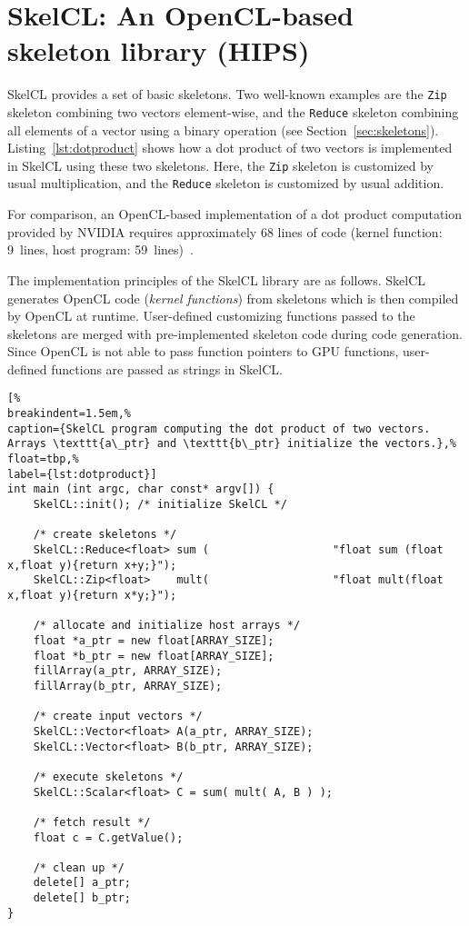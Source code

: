 \newpage







\section{SkelCL: An OpenCL-based skeleton library (HIPS)}

SkelCL provides a set of basic skeletons.
Two well-known examples are the \texttt{Zip} skeleton combining two vectors element-wise, and the \texttt{Reduce} skeleton combining all elements of a vector using a binary operation (see Section~\ref{sec:skeletons}).
Listing~\ref{lst:dotproduct} shows how a dot product of two vectors is implemented in SkelCL using these two skeletons.
Here, the \texttt{Zip} skeleton is customized by usual multiplication, and the \texttt{Reduce} skeleton is customized by usual addition.

For comparison, an OpenCL-based implementation of a dot product computation provided by NVIDIA requires approximately 68 lines of code (kernel function: 9~lines, host program: 59~lines)~\cite{CUDASDK-10}.

The implementation principles of the SkelCL library are as follows.
SkelCL generates OpenCL code (\emph{kernel functions}) from skeletons which is then compiled by OpenCL at runtime.
User-defined customizing functions passed to the skeletons are merged with pre-implemented skeleton code during code generation.
Since OpenCL is not able to pass function pointers to GPU functions, user-defined functions are passed as strings in SkelCL.

\begin{lstlisting}[%
breakindent=1.5em,%
caption={SkelCL program computing the dot product of two vectors. Arrays \texttt{a\_ptr} and \texttt{b\_ptr} initialize the vectors.},%
float=tbp,%
label={lst:dotproduct}]
int main (int argc, char const* argv[]) {
    SkelCL::init(); /* initialize SkelCL */

    /* create skeletons */
    SkelCL::Reduce<float> sum (                   "float sum (float x,float y){return x+y;}");
    SkelCL::Zip<float>    mult(                   "float mult(float x,float y){return x*y;}");

    /* allocate and initialize host arrays */
    float *a_ptr = new float[ARRAY_SIZE];
    float *b_ptr = new float[ARRAY_SIZE];
    fillArray(a_ptr, ARRAY_SIZE);
    fillArray(b_ptr, ARRAY_SIZE);

    /* create input vectors */
    SkelCL::Vector<float> A(a_ptr, ARRAY_SIZE);
    SkelCL::Vector<float> B(b_ptr, ARRAY_SIZE);

    /* execute skeletons */
    SkelCL::Scalar<float> C = sum( mult( A, B ) );

    /* fetch result */
    float c = C.getValue();
    
    /* clean up */
    delete[] a_ptr;
    delete[] b_ptr;
}
\end{lstlisting}


